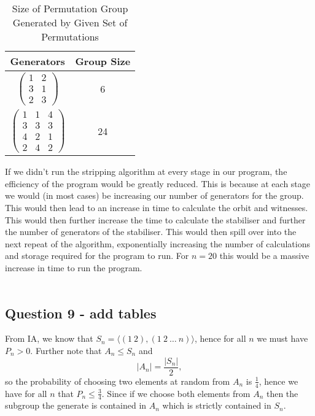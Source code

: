 \documentclass{article}
\begin{document}
\begin{table}[hp]
\begin{center}
\begin{tabular}{|c|c|}
\hline
Generators & Group Size \\ \hline
     $\begin{pmatrix}
     1  &   2\\
     3  &   1\\
     2  &   3
     \end{pmatrix}$      &      6      \\
     $\begin{pmatrix}
    1  & 1  & 4\\
     3 &  3 &  3\\
     4 &  2 & 1\\
     2 &  4 & 2     
     \end{pmatrix}$      &         24  \\
     \hline
\end{tabular}
\caption{Size of Permutation Group Generated by Given Set of Permutations}
\end{center}
\end{table}

If we didn't run the stripping algorithm at every stage in our program,  the efficiency of the program would be greatly reduced. This is because at each stage we would (in most cases) be increasing our number of generators for the group. This would then lead to an increase in time to calculate the orbit and witnesses.  This would then further increase the time to calculate the stabiliser and further the number of generators of the stabiliser. This would then spill over into the next repeat of the algorithm, exponentially increasing the number of calculations and storage required for the program to run.  For $n=20$ this would be a massive increase in time to run the program.  \\\\

\subsection{Question 9 - add tables}
From IA, we know that $S_n=\langle (1\ 2),(1\ 2\ \ldots\ n)\rangle$, hence for all $n$ we must have $P_n>0$. Further note that $A_n\leq S_n$ and 
\[|A_n|=\frac{|S_n|}2,\]
so the probability of choosing two elements at random from $A_n$ is $\frac{1}4$,  hence  we have for all $n$ that $P_n\leq\frac{3}4$. Since if we choose both elements from $A_n$ then the subgroup the generate is contained in $A_n$ which is strictly contained in $S_n$.\\\\
\end{document}
